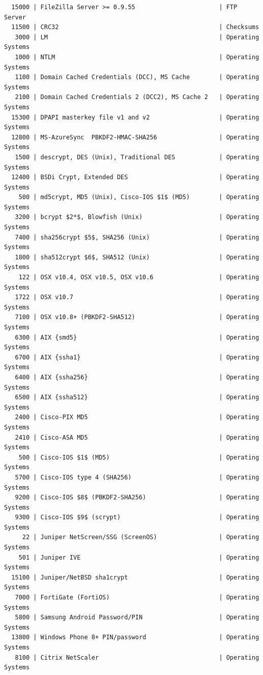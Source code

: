 \documentclass{article}
\begin{document}
\begin{lstlisting}
  15000 | FileZilla Server >= 0.9.55                       | FTP Server
  11500 | CRC32                                            | Checksums
   3000 | LM                                               | Operating Systems
   1000 | NTLM                                             | Operating Systems
   1100 | Domain Cached Credentials (DCC), MS Cache        | Operating Systems
   2100 | Domain Cached Credentials 2 (DCC2), MS Cache 2   | Operating Systems
  15300 | DPAPI masterkey file v1 and v2                   | Operating Systems
  12800 | MS-AzureSync  PBKDF2-HMAC-SHA256                 | Operating Systems
   1500 | descrypt, DES (Unix), Traditional DES            | Operating Systems
  12400 | BSDi Crypt, Extended DES                         | Operating Systems
    500 | md5crypt, MD5 (Unix), Cisco-IOS $1$ (MD5)        | Operating Systems
   3200 | bcrypt $2*$, Blowfish (Unix)                     | Operating Systems
   7400 | sha256crypt $5$, SHA256 (Unix)                   | Operating Systems
   1800 | sha512crypt $6$, SHA512 (Unix)                   | Operating Systems
    122 | OSX v10.4, OSX v10.5, OSX v10.6                  | Operating Systems
   1722 | OSX v10.7                                        | Operating Systems
   7100 | OSX v10.8+ (PBKDF2-SHA512)                       | Operating Systems
   6300 | AIX {smd5}                                       | Operating Systems
   6700 | AIX {ssha1}                                      | Operating Systems
   6400 | AIX {ssha256}                                    | Operating Systems
   6500 | AIX {ssha512}                                    | Operating Systems
   2400 | Cisco-PIX MD5                                    | Operating Systems
   2410 | Cisco-ASA MD5                                    | Operating Systems
    500 | Cisco-IOS $1$ (MD5)                              | Operating Systems
   5700 | Cisco-IOS type 4 (SHA256)                        | Operating Systems
   9200 | Cisco-IOS $8$ (PBKDF2-SHA256)                    | Operating Systems
   9300 | Cisco-IOS $9$ (scrypt)                           | Operating Systems
     22 | Juniper NetScreen/SSG (ScreenOS)                 | Operating Systems
    501 | Juniper IVE                                      | Operating Systems
  15100 | Juniper/NetBSD sha1crypt                         | Operating Systems
   7000 | FortiGate (FortiOS)                              | Operating Systems
   5800 | Samsung Android Password/PIN                     | Operating Systems
  13800 | Windows Phone 8+ PIN/password                    | Operating Systems
   8100 | Citrix NetScaler                                 | Operating Systems

\end{lstlisting}
\end{document}

